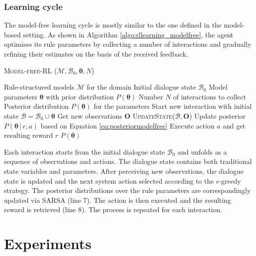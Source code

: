 \subsubsection*{Learning cycle}

The model-free learning cycle is mostly similar to the one defined in the model-based setting.  As shown in Algorithm \ref{algo:rllearning_modelfree}, the agent optimises its rule parameters by collecting a number of interactions and gradually refining their estimates on the basis of the received feedback. 

\begin{algorithm}[ht]
\caption{\textsc{Model-free-RL} ($\mathcal{M}, \mathcal{B}_0, \boldsymbol\theta, N$)}
\begin{algorithmic}[1]\vspace{1mm}
\REQUIRE Rule-structured models $\mathcal{M}$ for the domain
\REQUIRE Initial dialogue state $\mathcal{B}_0$
\REQUIRE Model parameters $\boldsymbol\theta$ with prior distribution $P(\boldsymbol\theta)$
\REQUIRE Number $N$ of interactions to collect
\ENSURE Posterior distribution $P(\boldsymbol\theta)$ for the parameters  \vspace{1mm}
\STATE Start new interaction with initial state $\mathcal{B} = \mathcal{B}_0 \cup \boldsymbol\theta $
\STATE Get new observations $\mathbf{O}$
\STATE \textsc{UpdateState}($\mathcal{B}, \mathbf{O}$)
\STATE Update posterior $P(\boldsymbol\theta \, | \, r, a)$ based on Equation \eqref{eq:posteriormodelfree}
\STATE Execute action $a$ and get resulting reward $r$
\ENDIF
\ENDWHILE
\ENDFOR
\RETURN $P(\boldsymbol\theta)$
\end{algorithmic} 
\label{algo:rllearning_modelfree}
\end{algorithm}

Each interaction starts from the initial dialogue state $\mathcal{B}_0$ and unfolds as a sequence of observations and actions.  The dialogue state contains both traditional state variables and parameters.  After perceiving new observations, the dialogue state is updated and the next system action selected according to the $\epsilon$-greedy strategy. The posterior distributions over the rule parameters are correspondingly updated via SARSA (line 7). The action is then executed and the resulting reward is retrieved (line 8).  The process is repeated for each interaction. 

\section{Experiments}
\label{sec:rllearning-experiments}

